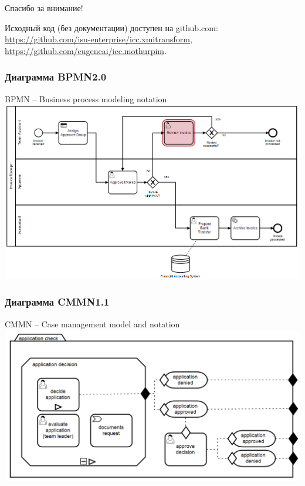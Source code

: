 \documentclass[10pt]{beamer}
\begin{document}
\begin{frame}
  \vfill
  \begin{center}
    {\Huge Спасибо за внимание!}
  \end{center}
  \vfill
  Исходный код (без документации) доступен на github.com: \url{https://github.com/isu-enterprise/icc.xmitransform}, \url{https://github.com/eugeneai/icc.mothurpim}.
\end{frame}


\begin{frame}
  \frametitle{Диаграмма BPMN2.0}
  BPMN -- Business process modeling notation
  \centering
    \includegraphics[width=1\linewidth]{qms-pics/bpmn.png}
\end{frame}
\begin{frame}
  \frametitle{Диаграмма CMMN1.1}
  CMMN -- Case management model and notation
  \centering
    \includegraphics[width=1\linewidth]{qms-pics/cmmn.png}
\end{frame}
\end{document}
